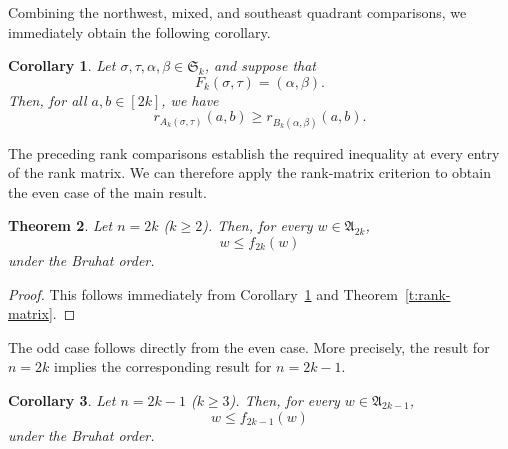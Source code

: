 \documentclass[12pt]{amsart}
\newtheorem{thm}{Theorem}[section]
\newtheorem{cor}[thm]{Corollary}
\theoremstyle{definition}
\numberwithin{equation}{section}
\begin{document}
Combining the northwest, mixed, and southeast quadrant comparisons, we
immediately obtain the following corollary.

\begin{cor}\label{c:rank comparison even}
Let $\sigma,\tau,\alpha,\beta\in\mathfrak S_k$, and suppose that
\begin{equation*}
F_k(\sigma,\tau)=(\alpha,\beta).
\end{equation*}
Then, for all $a,b\in[2k]$, we have
\begin{equation*}
r_{A_k(\sigma,\tau)}(a,b)
\geq
r_{B_k(\alpha,\beta)}(a,b).
\end{equation*}
\end{cor}

The preceding rank comparisons establish the required inequality at
every entry of the rank matrix. We can therefore apply the rank-matrix
criterion to obtain the even case of the main result.

\begin{thm}\label{thm:even case}
Let $n=2k$ ($k\geq 2$). Then, for every $w\in\mathfrak A_{2k}$,
\begin{equation*}
w\leq f_{2k}(w)
\end{equation*}
under the Bruhat order.
\end{thm}

\begin{proof}
This follows immediately from Corollary~\ref{c:rank comparison even}
and Theorem~\ref{t:rank-matrix}.
\end{proof}

The odd case follows directly from the even case. More precisely, the
result for $n=2k$ implies the corresponding result for $n=2k-1$.

\begin{cor}\label{c:odd case}
Let $n=2k-1$ ($k\geq 3$). Then, for every $w\in\mathfrak A_{2k-1}$,
\begin{equation*}
w\leq f_{2k-1}(w)
\end{equation*}
under the Bruhat order.
\end{cor}
\end{document}
